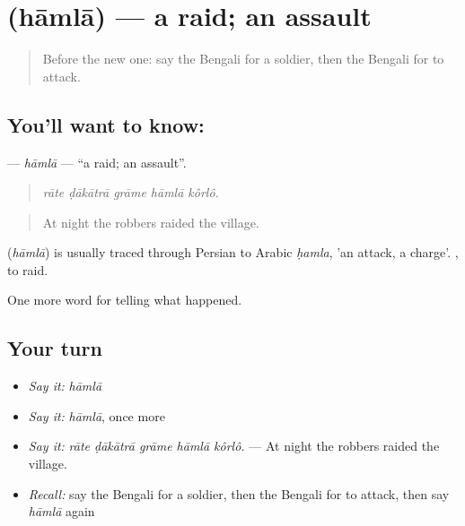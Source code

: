\section[\texorpdfstring{\bn{হামলা} (hāmlā)}{হামলা (hāmlā)}]{ (hāmlā) — a raid; an assault}

\label{lesson:BN-C314-hamla}



\begin{quote}
Before the new one: say the Bengali for a soldier, then the Bengali for to attack.
\end{quote}

\subsection*{You'll want to know: }
\textbf{} — \emph{hāmlā} — \textquotedblleft{}a raid; an assault\textquotedblright{}.

\begin{quote}
    
\end{quote}

\begin{quote}
\emph{rāte ḍākātrā grāme hāmlā kôrlô.}
\end{quote}

\begin{quote}
At night the robbers raided the village.
\end{quote}

\begin{cousinweb}
\textbf{} (\emph{hāmlā}) is usually traced through Persian to Arabic \emph{ḥamla}, 'an attack, a charge'.  , to raid.
\end{cousinweb}

\begin{grammarlens}[title={What you've built}]
One more word for telling what happened.
\end{grammarlens}

\subsection*{Your turn}
\begin{itemize}
\raggedright
  \item \emph{Say it:} \emph{hāmlā}
  \item \emph{Say it:} \emph{hāmlā}, once more
  \item \emph{Say it:} \emph{rāte ḍākātrā grāme hāmlā kôrlô.} — At night the robbers raided the village.
  \item \emph{Recall:} say the Bengali for a soldier, then the Bengali for to attack, then say \emph{hāmlā} again
\end{itemize}

